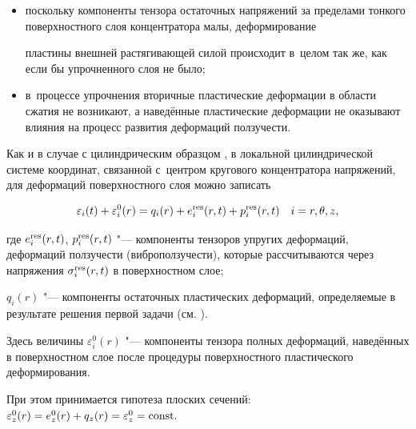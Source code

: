 \begin{itemize}

\item[1)] поскольку компоненты тензора остаточных напряжений за пределами тонкого поверхностного слоя концентратора малы, деформирование

пластины внешней растягивающей силой  происходит в~целом так же, как если бы упрочненного слоя не было;



\item[2)]  в~процессе упрочнения вторичные пластические деформации в области сжатия не возникают, а наведённые пластические деформации не оказывают влияния на процесс развития деформаций ползучести.

\end{itemize}





Как и в случае с цилиндрическим образцом \cite{SauDub10}, в локальной цилиндрической системе координат, связанной с~центром кругового концентратора напряжений, для деформаций поверхностного слоя можно записать

\begin{gather}

 \label{eq:rel_epstet}

\varepsilon_{i}(t)+\varepsilon_{i}^0(r) = q_i(r)+e_i^{\rm res} (r, t) + p_i^{\rm res} (r, t)  \quad i={r, \theta, z},

\end{gather}

где $e_i^{\rm res} (r, t)$, $p_i^{\rm res} (r, t)$ "--- компоненты тензоров упругих деформаций, деформаций ползучести (виброползучести), которые рассчитываются через напряжения $\sigma_i^{\rm res} (r,t)$ в поверхностном слое;

$q_i(r)$ "--- компоненты остаточных пластических деформаций, определяемые в результате решения первой задачи (см. \cite{dubovova:8}).

Здесь величины $\varepsilon_{i}^{0}(r)$ "--- компоненты тензора полных деформаций, наведённых в поверхностном слое после процедуры поверхностного пластического деформирования. 

При этом принимается гипотеза плоских сечений: $\varepsilon_{z}^{0}(r) = e^{0}_{z}(r) + q_{z}(r) = \varepsilon_{z}^{0} = \rm const.$

%


